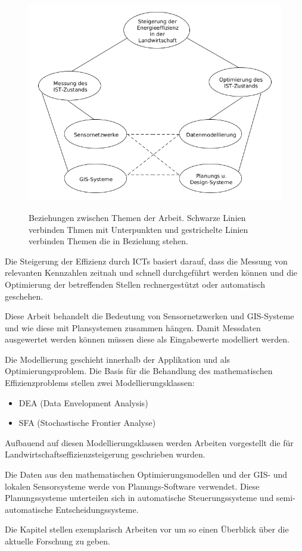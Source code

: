 \begin{figure}[h]
 \includegraphics[scale=0.65,natwidth=\textwidth]{figures/introduction/topic_overview.png}
 \centering
 \label{fig:topic_overview}
 \caption{Beziehungen zwischen Themen der Arbeit. Schwarze Linien verbinden Thmen mit Unterpunkten und gestrichelte Linien verbinden Themen die in Beziehung stehen.}
\end{figure}

Die Steigerung der Effizienz durch ICTs basiert darauf, dass die Messung von relevanten Kennzahlen zeitnah und schnell durchgeführt werden können und die Optimierung der betreffenden Stellen rechnergestützt oder automatisch geschehen.

Diese Arbeit behandelt die Bedeutung von Sensornetzwerken und GIS-Systeme und wie diese mit Plansystemen zusammen hängen. Damit Messdaten ausgewertet werden können müssen diese als Eingabewerte modelliert werden. 

Die Modellierung geschieht innerhalb der Applikation und als Optimierungsproblem. Die Basis für die Behandlung des mathematischen Effizienzproblems stellen zwei Modellierungsklassen:

\begin{itemize}
	\item DEA (Data Envelopment Analysis)
	\item SFA (Stochastische Frontier Analyse)
\end{itemize}

Aufbauend auf diesen Modellierungsklassen werden Arbeiten vorgestellt die für Landwirtschaftseffizienzsteigerung geschrieben wurden.

Die Daten aus den mathematischen Optimierungsmodellen und der GIS- und lokalen Sensorsysteme werde von Planungs-Software verwendet. Diese Planungssysteme unterteilen sich in automatische Steuerungssysteme und semi-automatische Entscheidungssysteme. 

Die Kapitel stellen exemplarisch Arbeiten vor um so einen Überblick über die aktuelle Forschung zu geben.